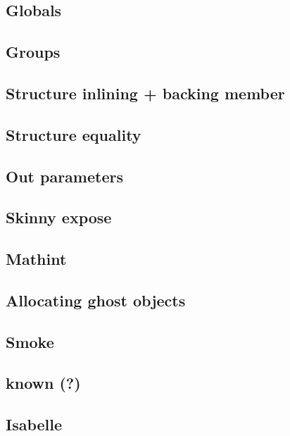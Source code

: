 \subsection{Globals}
\subsection{Groups}
\subsection{Structure inlining + backing member}
\subsection{Structure equality}
\subsection{Out parameters}
\subsection{Skinny expose}
\subsection{Mathint}
\subsection{Allocating ghost objects}
\subsection{Smoke}
\subsection{known (?)}
\subsection{Isabelle}
